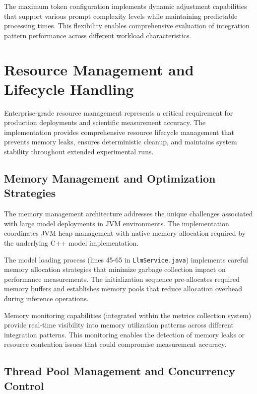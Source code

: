 The maximum token configuration implements dynamic adjustment capabilities that support various prompt complexity levels while maintaining predictable processing times. This flexibility enables comprehensive evaluation of integration pattern performance across different workload characteristics.


\section{Resource Management and Lifecycle Handling}

Enterprise-grade resource management represents a critical requirement for production deployments and scientific measurement accuracy. The implementation provides comprehensive resource lifecycle management that prevents memory leaks, ensures deterministic cleanup, and maintains system stability throughout extended experimental runs.

\subsection{Memory Management and Optimization Strategies}

The memory management architecture addresses the unique challenges associated with large model deployments in JVM environments. The implementation coordinates JVM heap management with native memory allocation required by the underlying C++ model implementation.

The model loading process (lines 45-65 in \texttt{LlmService.java}) implements careful memory allocation strategies that minimize garbage collection impact on performance measurements. The initialization sequence pre-allocates required memory buffers and establishes memory pools that reduce allocation overhead during inference operations.


Memory monitoring capabilities (integrated within the metrics collection system) provide real-time visibility into memory utilization patterns across different integration patterns. This monitoring enables the detection of memory leaks or resource contention issues that could compromise measurement accuracy.

\subsection{Thread Pool Management and Concurrency Control}

